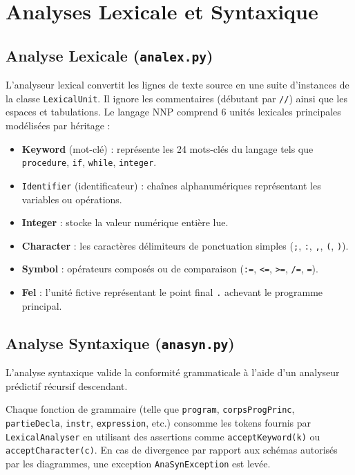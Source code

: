 \documentclass[a4paper, 12pt]{article}
\begin{document}
\newpage

\section{Analyses Lexicale et Syntaxique}

\subsection{Analyse Lexicale (\texttt{analex.py})}
L'analyseur lexical convertit les lignes de texte source en une suite d'instances de la classe \texttt{LexicalUnit}. Il ignore les commentaires (débutant par \texttt{//}) ainsi que les espaces et tabulations. Le langage NNP comprend 6 unités lexicales principales modélisées par héritage :
\begin{itemize}
    \item \textbf{Keyword} (mot-clé) : représente les 24 mots-clés du langage tels que \texttt{procedure}, \texttt{if}, \texttt{while}, \texttt{integer}.
    \item \texttt{Identifier} (identificateur) : chaînes alphanumériques représentant les variables ou opérations.
    \item \textbf{Integer} : stocke la valeur numérique entière lue.
    \item \textbf{Character} : les caractères délimiteurs de ponctuation simples (\texttt{;}, \texttt{:}, \texttt{,}, \texttt{(}, \texttt{)}).
    \item \textbf{Symbol} : opérateurs composés ou de comparaison (\texttt{:=}, \texttt{<=}, \texttt{>=}, \texttt{/=}, \texttt{=}).
    \item \textbf{Fel} : l'unité fictive représentant le point final \texttt{.} achevant le programme principal.
\end{itemize}

\subsection{Analyse Syntaxique (\texttt{anasyn.py})}
L'analyse syntaxique valide la conformité grammaticale à l'aide d'un analyseur prédictif récursif descendant. 

Chaque fonction de grammaire (telle que \texttt{program}, \texttt{corpsProgPrinc}, \texttt{partieDecla}, \texttt{instr}, \texttt{expression}, etc.) consomme les tokens fournis par \texttt{LexicalAnalyser} en utilisant des assertions comme \texttt{acceptKeyword(k)} ou \texttt{acceptCharacter(c)}. En cas de divergence par rapport aux schémas autorisés par les diagrammes, une exception \texttt{AnaSynException} est levée.
\end{document}
